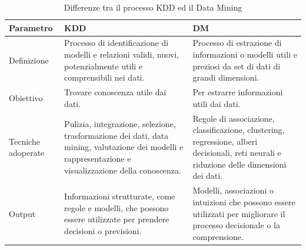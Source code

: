 \begin{longtable}{|p{4cm}|p{5cm}|p{5cm}|}
    \caption{Differenze tra il processo KDD ed il Data Mining} \\
    \hline
    
    \textbf{Parametro} & \textbf{KDD} & \textbf{DM}\\
    \hline 
    \endfirsthead

    Definizione & Processo di identificazione di modelli e relazioni validi, nuovi, potenzialmente utili e comprensibili nei dati. & Processo di estrazione di informazioni o modelli utili e preziosi da set di dati di grandi dimensioni.\\
    \hline
    Obiettivo & Trovare conoscenza utile dai dati. & Per estrarre informazioni utili dai dati.\\
    \hline
    Tecniche adoperate & Pulizia, integrazione, selezione, trasformazione dei dati, data mining, valutazione dei modelli e rappresentazione e visualizzazione della conoscenza. & Regole di associazione, classificazione, clustering, regressione, alberi decisionali, reti neurali e riduzione delle dimensioni dei dati.\\
    \hline
    Output & Informazioni strutturate, come regole e modelli, che possono essere utilizzate per prendere decisioni o previsioni. & Modelli, associazioni o intuizioni che possono essere utilizzati per migliorare il processo decisionale o la comprensione.\\
    \hline 
\end{longtable}
